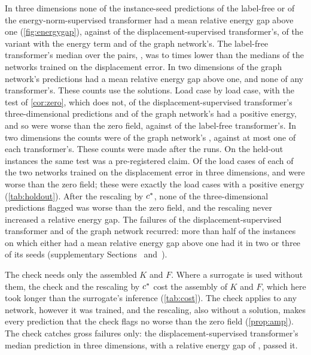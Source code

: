 In three dimensions none of the \numThreePairs{} instance-seed predictions of the label-free
or of the energy-norm-supervised transformer had a mean relative energy gap above one
(\cref{fig:energygap}), against \numThreeLabWorse{} of the displacement-supervised
transformer's, \numThreeAncWorse{} of the variant with the energy term and \numThreeMgnWorse{} of the graph network's. The label-free transformer's median over the
pairs, \numThreeFreeGapMedian{}, was \numThreeMedianRatioMin{} to \numThreeMedianRatioMax{}
times lower than the medians of the networks trained on the displacement error. In two
dimensions \numCmMgnWorse{} of the graph network's predictions had a mean relative energy
gap above one, and none of any transformer's. These counts use the solutions. Load case by
load case, with the test of \cref{cor:zero}, which does not, \numFieldLoadWorseLab{} of the
displacement-supervised transformer's \numFieldLoads{} three-dimensional predictions and
\numFieldLoadWorseMgn{} of the graph network's had a positive energy, and so were worse than
the zero field, against \numThreeFreeLoadWorse{} of the label-free transformer's. In two dimensions the counts
were \numSpecLoadWorseMgn{} of the graph network's \numSpecLoads{}, against at most one of
each transformer's. These counts were made after the runs. On the held-out instances
the same test was a pre-registered claim. Of the \numHoldTThreeLoads{} load cases of each of
the two networks trained on the displacement error in three dimensions,
\numHoldTThreeLab{} and \numHoldTThreeMgn{} were worse than the zero field; these were
exactly the load cases with a positive energy (\cref{tab:holdout}). After the rescaling by $c^{\ast}$, none of the three-dimensional
predictions flagged was worse than the zero field, and the rescaling never increased a
relative energy gap. The failures of the displacement-supervised transformer and of the
graph network recurred: more than half of the instances on which either had a mean relative
energy gap above one had it in two or three of its seeds (supplementary
Sections~\SuppThree{} and~\SuppTwo{}).

The check needs only the assembled $K$ and $F$. Where a surrogate is used without them,
the check and the rescaling by $c^{\ast}$ cost the assembly of $K$ and $F$, which here took longer than the
surrogate's inference (\cref{tab:cost}). The check applies to any network, however it was
trained, and the rescaling, also without a solution, makes every prediction that the check
flags no worse than the zero field (\cref{prop:amp}). The check catches gross failures only: the displacement-supervised transformer's median prediction in
three dimensions, with a relative energy gap of \numThreeLabGapMedian{}, passed it.
